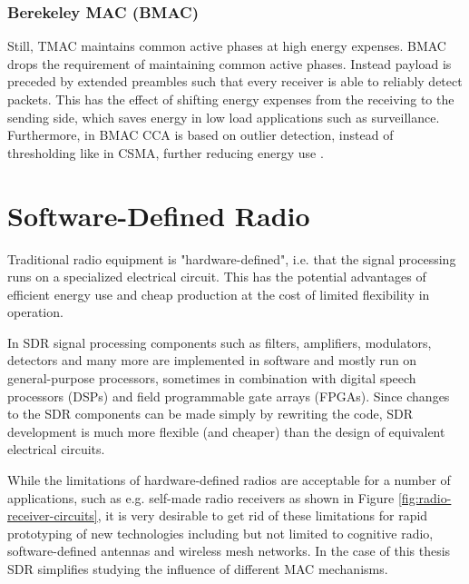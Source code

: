 \subsubsection{Berekeley MAC (BMAC)}

Still, TMAC maintains common active phases at high energy expenses. BMAC drops the requirement of maintaining common active phases. Instead payload is preceded by extended preambles such that every receiver is able to reliably detect packets. This has the effect of shifting energy expenses from the receiving to the sending side, which saves energy in low load applications such as surveillance. Furthermore, in BMAC CCA is based on outlier detection, instead of thresholding like in CSMA, further reducing energy use \cite{Polastre04}. 

\section{Software-Defined Radio}
 
Traditional radio equipment is "hardware-defined", i.e. that the signal processing runs on a specialized electrical circuit. This has the potential advantages of efficient energy use and cheap production at the cost of limited flexibility in operation. 

In SDR signal processing components such as filters, amplifiers, modulators, detectors and many more are implemented in software and mostly run on general-purpose processors, sometimes in combination with digital speech processors (DSPs) and field programmable gate arrays (FPGAs). Since changes to the SDR components can be made simply by rewriting the code, SDR development is much more flexible (and cheaper) than the design of equivalent electrical circuits.

While the limitations of hardware-defined radios are acceptable for a number of applications, such as e.g. self-made radio receivers as shown in Figure \ref{fig:radio-receiver-circuits}, it is very desirable to get rid of these limitations for rapid prototyping of new technologies including but not limited to cognitive radio, software-defined antennas and wireless mesh networks. In the case of this thesis SDR simplifies studying the influence of different MAC mechanisms.

